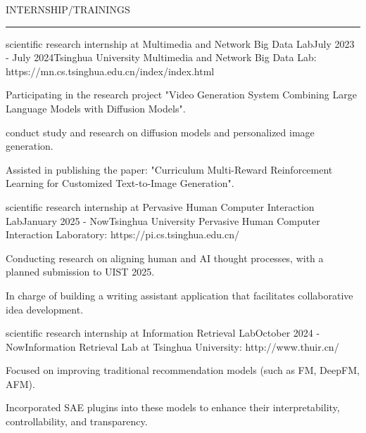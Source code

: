 \documentclass{resume} %
\renewenvironment{rSection}[1]{
\sectionskip
\textcolor{TsinghuaPurple}{\MakeUppercase{#1}}
\sectionlineskip
\hrule
\begin{list}{}{
\setlength{\leftmargin}{0em}
}
\item[]
}{
\end{list}
}
\begin{document}

\begin{rSection}{INTERNSHIP/TRAININGS}

\begin{rSubsection}{scientific research internship at Multimedia and Network Big Data Lab}{July 2023 - July 2024}{Tsinghua University Multimedia and Network Big Data Lab: https://mn.cs.tsinghua.edu.cn/index/index.html}{}              
\item Participating in the research project "Video Generation System Combining Large Language Models with Diffusion Models".  
\item conduct study and research on diffusion models and personalized image generation.
\item Assisted in publishing the paper: "Curriculum Multi-Reward Reinforcement Learning for Customized Text-to-Image Generation".
\end{rSubsection}  

\begin{rSubsection}{scientific research internship at Pervasive Human Computer Interaction Lab}{January 2025 - Now}{Tsinghua University Pervasive Human Computer Interaction Laboratory: https://pi.cs.tsinghua.edu.cn/}{}              
\item Conducting research on aligning human and AI thought processes, with a planned submission to UIST 2025.
\item In charge of building a writing assistant application that facilitates collaborative idea development.
\end{rSubsection}  

\begin{rSubsection}{scientific research internship at Information Retrieval Lab}{October 2024 - Now}{Information Retrieval Lab at Tsinghua University: http://www.thuir.cn/}{}              
\item Focused on improving traditional recommendation models (such as FM, DeepFM, AFM).
\item Incorporated SAE plugins into these models to enhance their interpretability, controllability, and transparency.
\end{rSubsection}  

\end{rSection}

  
\end{document}
